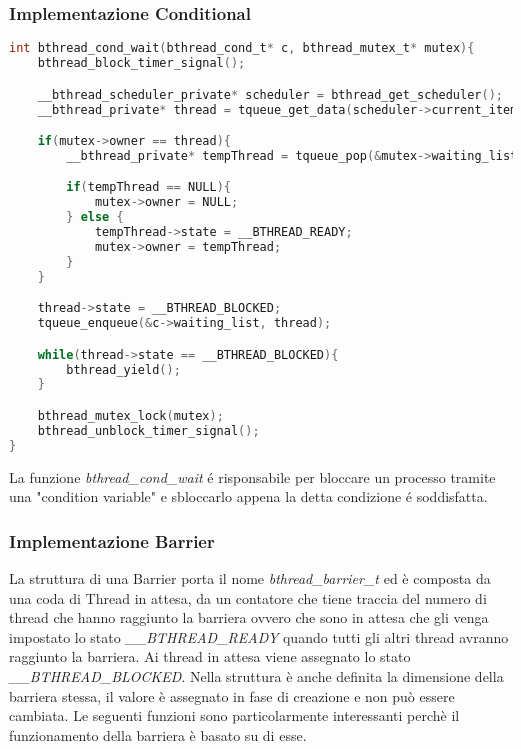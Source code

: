 \documentclass{article}
\begin{document}
\subsubsection{Implementazione Conditional}
\vspace{2mm}
\begin{lstlisting}[language=C]
int bthread_cond_wait(bthread_cond_t* c, bthread_mutex_t* mutex){
    bthread_block_timer_signal();

    __bthread_scheduler_private* scheduler = bthread_get_scheduler();
    __bthread_private* thread = tqueue_get_data(scheduler->current_item);

    if(mutex->owner == thread){
        __bthread_private* tempThread = tqueue_pop(&mutex->waiting_list);

        if(tempThread == NULL){
            mutex->owner = NULL;
        } else {
            tempThread->state = __BTHREAD_READY;
            mutex->owner = tempThread;
        }
    }

    thread->state = __BTHREAD_BLOCKED;
    tqueue_enqueue(&c->waiting_list, thread);

    while(thread->state == __BTHREAD_BLOCKED){
        bthread_yield();
    }

    bthread_mutex_lock(mutex);
    bthread_unblock_timer_signal();
}

\end{lstlisting}
\noindent La funzione \textit{bthread\_cond\_wait} é risponsabile per bloccare un processo tramite una "condition variable" e sbloccarlo appena la detta condizione é soddisfatta.


\vspace{2mm}

\subsubsection{Implementazione Barrier}

La struttura di una Barrier porta il nome \textit{bthread\_barrier\_t} ed è composta da una coda di Thread in attesa, da un contatore che tiene traccia del numero di thread che hanno raggiunto la barriera ovvero che sono in attesa che gli venga impostato lo stato \textit{\_\_BTHREAD\_READY} quando tutti gli altri thread avranno raggiunto la barriera. Ai thread in attesa viene assegnato lo stato \textit{\_\_BTHREAD\_BLOCKED}.
Nella struttura è anche definita la dimensione della barriera stessa, il valore è assegnato in fase di creazione e non può essere cambiata. Le seguenti funzioni sono particolarmente interessanti perchè il funzionamento della barriera è basato su di esse.
\end{document}
